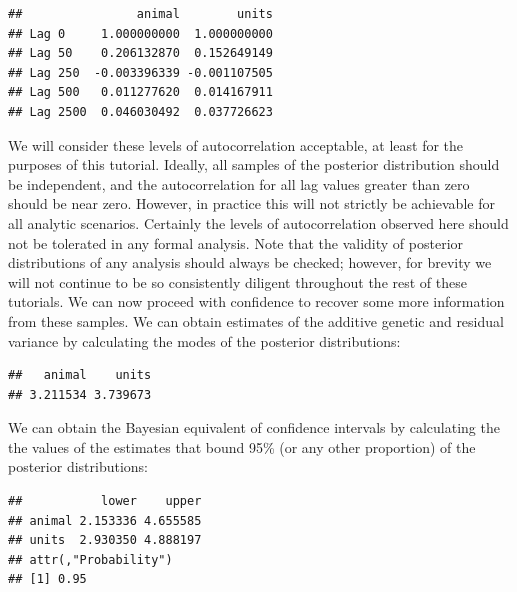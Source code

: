 \documentclass[
  12pt,
]{book}
\newenvironment{Shaded}{\begin{snugshade}}{\end{snugshade}}
\newcommand{\FloatTok}[1]{\textcolor[rgb]{0.00,0.00,0.81}{#1}}
\newcommand{\FunctionTok}[1]{\textcolor[rgb]{0.00,0.00,0.00}{#1}}
\newcommand{\NormalTok}[1]{#1}
\newcommand{\SpecialCharTok}[1]{\textcolor[rgb]{0.00,0.00,0.00}{#1}}
\begin{document}
\begin{verbatim}
##                animal        units
## Lag 0     1.000000000  1.000000000
## Lag 50    0.206132870  0.152649149
## Lag 250  -0.003396339 -0.001107505
## Lag 500   0.011277620  0.014167911
## Lag 2500  0.046030492  0.037726623
\end{verbatim}

We will consider these levels of autocorrelation acceptable, at least for the purposes of this tutorial. Ideally, all samples of the posterior distribution should be independent, and the autocorrelation for all lag values greater than zero should be near zero. However, in practice this will not strictly be achievable for all analytic scenarios. Certainly the levels of autocorrelation observed here should not be tolerated in any formal analysis.
Note that the validity of posterior distributions of any analysis should always be checked; however, for brevity we will not continue to be so consistently diligent throughout the rest of these tutorials. We can now proceed with confidence to recover some more information from these samples. We can obtain estimates of the additive genetic and residual variance by calculating the modes of the posterior distributions:

\begin{Shaded}
\end{Shaded}

\begin{verbatim}
##   animal    units 
## 3.211534 3.739673
\end{verbatim}

We can obtain the Bayesian equivalent of confidence intervals by calculating the the values of the estimates that bound 95\% (or any other proportion) of the posterior distributions:

\begin{Shaded}
\end{Shaded}

\begin{verbatim}
##           lower    upper
## animal 2.153336 4.655585
## units  2.930350 4.888197
## attr(,"Probability")
## [1] 0.95
\end{verbatim}
\end{document}
